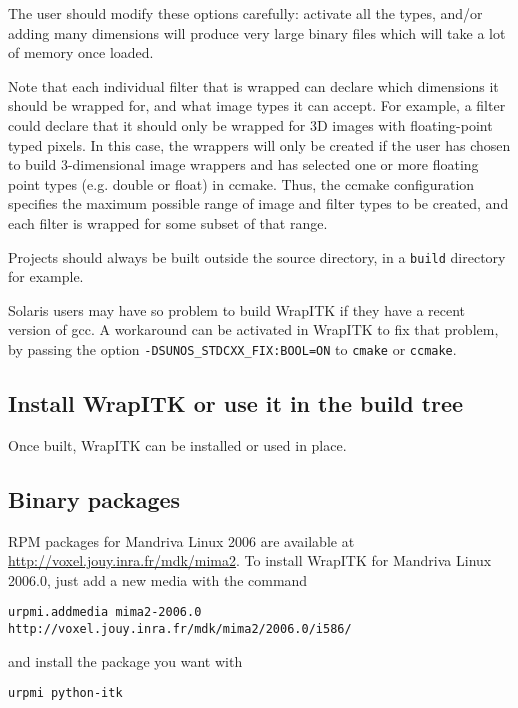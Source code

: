 \documentclass{InsightArticle}
\begin{document}
The user should modify these options carefully: activate all the types, and/or
adding many dimensions will produce very large binary files which will take a lot
of memory once loaded.

Note that each individual filter that is wrapped can declare which dimensions it
should be wrapped for, and what image types it can accept. For example, a filter
could declare that it should only be wrapped for 3D images with floating-point
typed pixels. In this case, the wrappers will only be created if the user has
chosen to build 3-dimensional image wrappers and has selected one or more
floating point types (e.g. double or float) in ccmake. Thus, the ccmake
configuration specifies the maximum possible range of image and filter types to
be created, and each filter is wrapped for some subset of that range.

Projects should always be built outside the source directory, in a \verb$build$
directory for example.

Solaris users may have so problem to build WrapITK if they have a recent version of
gcc. A workaround can be activated in WrapITK to fix that problem, by passing the
option \verb$-DSUNOS_STDCXX_FIX:BOOL=ON$ to \verb$cmake$ or \verb$ccmake$.

    \subsection{Install WrapITK or use it in the build tree}

Once built, WrapITK can be installed or used in place.

    \subsection{Binary packages}

RPM packages for Mandriva Linux 2006 are available at \url{http://voxel.jouy.inra.fr/mdk/mima2}.
To install WrapITK for Mandriva Linux 2006.0, just add a new media with the
command

\begin{verbatim}
urpmi.addmedia mima2-2006.0 http://voxel.jouy.inra.fr/mdk/mima2/2006.0/i586/
\end{verbatim}

and install the package you want with

\begin{verbatim}
urpmi python-itk
\end{verbatim}
\end{document}
